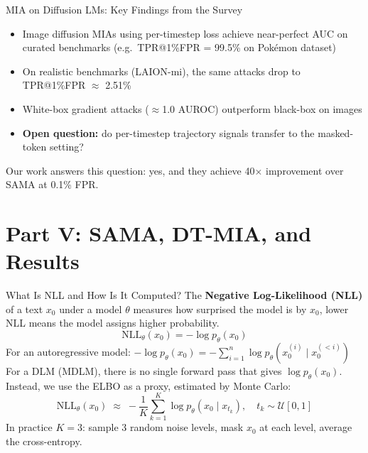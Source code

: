 \documentclass[10pt, aspectratio=169]{beamer}
\newcommand{\NLL}{\mathrm{NLL}}
\begin{document}
\begin{frame}{MIA on Diffusion LMs: Key Findings from the Survey}
  \begin{itemize}
    \item Image diffusion MIAs using per-timestep loss achieve near-perfect AUC on curated benchmarks (e.g.\ TPR@1\%FPR = 99.5\% on Pok\'{e}mon dataset)
    \item On realistic benchmarks (LAION-mi), the same attacks drop to TPR@1\%FPR $\approx$ 2.51\%
    \item White-box gradient attacks ($\approx$1.0 AUROC) outperform black-box on images
    \item \textbf{Open question:} do per-timestep trajectory signals transfer to the masked-token setting?
  \end{itemize}
  \vspace{8pt}
  Our work answers this question: yes, and they achieve 40$\times$ improvement over SAMA at 0.1\% FPR.
\end{frame}

\section{Part V: SAMA, DT-MIA, and Results}


\begin{frame}{What Is NLL and How Is It Computed?}
  The \textbf{Negative Log-Likelihood (NLL)} of a text $x_0$ under a model $\theta$ measures
  how surprised the model is by $x_0$, lower NLL means the model assigns higher probability.
  \[
    \NLL_\theta(x_0) = -\log p_\theta(x_0)
  \]
  For an autoregressive model: $-\log p_\theta(x_0) = -\sum_{i=1}^{n}\log p_\theta(x_0^{(i)}\mid x_0^{(<i)})$\\[8pt]
  For a DLM (MDLM), there is no single forward pass that gives $\log p_\theta(x_0)$.
  Instead, we use the ELBO as a proxy, estimated by Monte Carlo:
  \[
    \NLL_\theta(x_0) \;\approx\; -\frac{1}{K}\sum_{k=1}^{K}\log p_\theta(x_0 \mid x_{t_k}),
    \quad t_k \sim \mathcal{U}[0,1]
  \]
  In practice $K=3$: sample 3 random noise levels, mask $x_0$ at each level, average the cross-entropy.
\end{frame}

\end{document}
